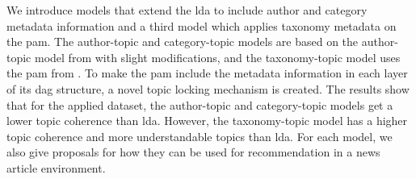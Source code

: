We introduce models that extend the \gls{lda} to include author and category metadata information and a third model which applies taxonomy metadata on the \gls{pam}.
The author-topic and category-topic models are based on the author-topic model from \citet{author_topic_2012} with slight modifications, and the taxonomy-topic model uses the \gls{pam} from \citet{li2006pachinko}.
To make the \gls{pam} include the metadata information in each layer of its \gls{dag} structure, a novel topic locking mechanism is created.
The results show that for the applied dataset, the author-topic and category-topic models get a lower topic coherence than \gls{lda}. 
However, the taxonomy-topic model has a higher topic coherence and more understandable topics than \gls{lda}.
For each model, we also give proposals for how they can be used for recommendation in a news article environment.
